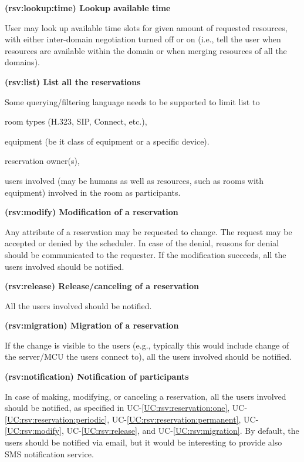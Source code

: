 \documentclass[a4paper]{report}
\makeatletter
\newcounter{UCcounter}
\newenvironment{UseCases}%
	{\begin{list}{\textbf{UC-\arabic{UCcounter}}}{\@nmbrlisttrue\def\@listctr{UCcounter}}}%
	{\end{list}}
\newcommand{\UClabel}[1]{\label{UC:#1}}
\newcommand{\UCref}[1]{UC-\ref{UC:#1}}
\newcommand{\UseCase}[2]{\item\UClabel{#2} \textbf{(#2) #1}\\ \nopagebreak}
\makeatother
\begin{document}
\begin{UseCases}
\UseCase{Lookup available time}{rsv:lookup:time}

User may look up available time slots for given amount of requested resources,
with either inter-domain negotiation turned off or on (i.e., tell the user when
resources are available within the domain or when merging resources of all the
domains).

\UseCase{List all the reservations}{rsv:list}

Some querying/filtering language needs to be supported to limit list to

\begin{compactitem}

\item room types (H.323, SIP, Connect, etc.),

\item equipment (be it class of equipment or a specific device).

\item reservation owner(s),

\item users involved (may be humans as well as resources, such as rooms with
equipment) involved in the room as participants.

\end{compactitem}

\UseCase{Modification of a reservation}{rsv:modify}

Any attribute of a reservation may be requested to change. The request may be
accepted or denied by the scheduler. In case of the denial, reasons for denial
should be communicated to the requester. If the modification succeeds, all the
users involved should be notified.

\UseCase{Release/canceling of a reservation}{rsv:release}

All the users involved should be notified.

\UseCase{Migration of a reservation}{rsv:migration}

If the change is visible to the users (e.g., typically this would include
change of the server/MCU the users connect to), all the users involved should
be notified.

\UseCase{Notification of participants}{rsv:notification}

In case of making, modifying, or canceling a reservation, all the users
involved should be notified, as specified in \UCref{rsv:reservation:one},
\UCref{rsv:reservation:periodic}, \UCref{rsv:reservation:permanent},
\UCref{rsv:modify}, \UCref{rsv:release}, and \UCref{rsv:migration}. By default,
the users should be notified via email, but it would be interesting to provide
also SMS notification service.


\end{UseCases}
\end{document}
